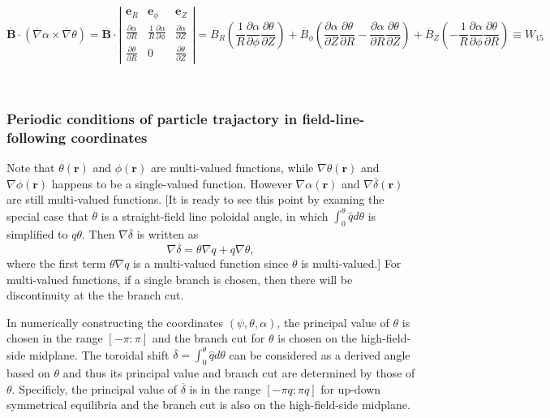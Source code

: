 \documentclass{article}
\begin{document}
\begin{equation}
  \overline{\mathbf{B}} \cdot (\overline{\nabla} \alpha \times
  \overline{\nabla} \theta) = \overline{\mathbf{B}} \cdot
  \left|\begin{array}{ccc}
    \mathbf{e}_R & \mathbf{e}_{\phi} & \mathbf{e}_Z\\
    \frac{\partial \alpha}{\partial R} & \frac{1}{R}  \frac{\partial
    \alpha}{\partial \phi} & \frac{\partial \alpha}{\partial Z}\\
    \frac{\partial \theta}{\partial R} & 0 & \frac{\partial \theta}{\partial
    Z}
  \end{array}\right| = \overline{B}_R \left( \frac{1}{R}  \frac{\partial
  \alpha}{\partial \phi} \frac{\partial \theta}{\partial Z} \right) +
  \overline{B}_{\phi} \left( \frac{\partial \alpha}{\partial Z} \frac{\partial
  \theta}{\partial R} - \frac{\partial \alpha}{\partial R} \frac{\partial
  \theta}{\partial Z} \right) + \overline{B}_Z \left( - \frac{1}{R} 
  \frac{\partial \alpha}{\partial \phi} \frac{\partial \theta}{\partial R}
  \right) \equiv W_{15}
\end{equation}


\

\subsubsection{Periodic conditions of particle trajactory in
field-line-following coordinates}

Note that $\theta (\mathbf{r})$ and $\phi (\mathbf{r})$ are multi-valued
functions, while $\nabla \theta (\mathbf{r})$ and $\nabla \phi (\mathbf{r})$
happens to be a single-valued function. However $\nabla \alpha (\mathbf{r})$
and $\nabla \overline{\delta} (\mathbf{r})$ are still multi-valued functions.
[It is ready to see this point by examing the special case that $\theta$ is a
straight-field line poloidal angle, in which $\int_0^{\theta} \hat{q} d
\theta$ is simplified to $q \theta$. Then $\nabla \overline{\delta}$ is
written as
\begin{equation}
  \nabla \overline{\delta} = \theta \nabla q + q \nabla \theta,
\end{equation}
where the first term $\theta \nabla q$ is a multi-valued function since
$\theta$ is multi-valued.] For multi-valued functions, if a single branch is
chosen, then there will be discontinuity at the the branch cut.

In numerically constructing the coordinates $(\psi, \theta, \alpha)$, the
principal value of $\theta$ is chosen in the range $[- \pi : \pi]$ and the
branch cut for $\theta$ is chosen on the high-field-side midplane. The
toroidal shift $\overline{\delta} = \int_0^{\theta} \hat{q} d \theta$ can be
considered as a derived angle based on $\theta$ and thus its principal value
and branch cut are determined by those of $\theta$. Specificly, the principal
value of $\overline{\delta}$ is in the range $[- \pi q : \pi q]$ for up-down
symmetrical equilibria and the branch cut is also on the high-field-side
midplane.
\end{document}

